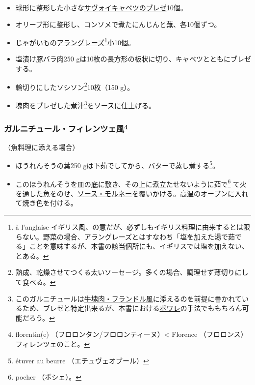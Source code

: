 \begin{recette}
\begin{itemize}
\item
  球形に整形した小さな\protect\hyperlink{chou-braise}{サヴォイキャベツのブレゼ}10個。
\item
  オリーブ形に整形し、コンソメで煮たにんじんと蕪、各10個ずつ。
\item
  \protect\hyperlink{pommes-de-terres-a-l-anglaise}{じゃがいものアラングレーズ}\footnote{à
    l'anglaise
    イギリス風、の意だが、必ずしもイギリス料理に由来するとは限らない。野菜の場合、アラングレーズとはすなわち「塩を加えた湯で茹でる」ことを意味するが、本書の該当個所にも、イギリスでは塩を加えない、とある。}小10個。
\item
  塩漬け豚バラ肉250
  gは10枚の長方形の板状に切り、キャベツとともにブレゼする。
\item
  輪切りにしたソシソン\footnote{熟成、乾燥させてつくる太いソーセージ。多くの場合、調理せず薄切りにして食べる。}10枚（150
  g）。
\item
  塊肉をブレゼした煮汁\footnote{このガルニチュールは\protect\hyperlink{piece-de-boeuf-a-la-flammande}{牛塊肉・フランドル風}に添えるのを前提に書かれているため、ブレゼと特定出来るが、本書における\protect\hyperlink{les-poeles}{ポワレ}の手法でももちろん可能だろう。}をソースに仕上げる。
\end{itemize}

\hypertarget{garniture-a-la-florentine}{%
\subsubsection[ガルニチュール・フィレンツェ風]{\texorpdfstring{ガルニチュール・フィレンツェ風\footnote{florentin(e)
  （フロロンタン/フロロンティーヌ）\textless{} Florence
  （フロロンス）フィレンツェのこと。}}{ガルニチュール・フィレンツェ風}}\label{garniture-a-la-florentine}}



（魚料理に添える場合）

\begin{itemize}
\item
  ほうれんそうの葉250 gは下茹でしてから、バターで蒸し煮する\footnote{étuver
    au beurre （エチュヴェオブール）}。
\item
  このほうれんそうを皿の底に敷き、その上に煮立たせないように茹で\footnote{pocher
    （ポシェ）。}
  て火を通した魚をのせ、\protect\hyperlink{sauce-mornay}{ソース・モルネー}を覆いかける。高温のオーブンに入れて焼き色を付ける。
\end{itemize}


\end{recette}
